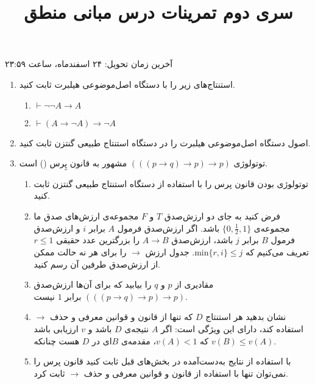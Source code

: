 \documentclass[12pt, 14paper]{article}
\title{سری دوم تمرینات درس مبانی منطق}
\author{}
\date{}
\begin{document}
\maketitle

\vspace{-2.5cm}

\begin{center}آخرین زمان تحویل: ۲۴ اسفندماه، ساعت ۲۳:۵۹\end{center}

\vspace{0.5cm}

\begin{enumerate}

\item
استنتاج‌های زیر را با دستگاه اصل‌موضوعی هیلبرت ثابت کنید.

\begin{enumerate}
\item
$\vdash \neg\neg A\to A$

\item
$\vdash (A\to\neg A)\to \neg A$
\end{enumerate}

\item
اصول دستگاه اصل‌موضوعی هیلبرت را در دستگاه استنتاج طبیعی گنتزن ثابت کنید.

\item
توتولوژی
$(((p\to q)\to p)\to p)$
مشهور به قانون پِرس
()
است.
\begin{enumerate}
\item
توتولوژی بودن قانون پرس را با استفاده از دستگاه استنتاج طبیعی گنتزن ثابت کنید.
\item
فرض کنید به جای دو ارزش‌صدق $T$ و $F$ مجموعه‌ی ارزش‌های صدق ما مجموعه‌ی $\{0,\frac{1}{2},1\}$ باشد. اگر ارزش‌صدق فرمول $A$ برابر $i$ و ارزش‌صدق فرمول $B$ برابر $j$ باشد، ارزش‌صدق $A\to B$ را بزرگترین عدد حقیقی $r\leq 1$ تعریف می‌کنیم که
$\text{min}\{r,i\}\leq j$.
جدول ارزش $\to$ را برای هر نه حالت ممکن از ارزش‌صدق طرفین آن رسم کنید.
\item
مقادیری از $p$ و $q$ را بیابید که برای آن‌ها ارزش‌صدق $(((p\to q)\to p)\to p)$ برابر $1$ نیست.
\item
نشان بدهید هر استنتاج $D$ که تنها از قانون
و قوانین معرفی و حذف $\to$ استفاده کند، دارای این ویژگی است: اگر $A$ نتیجه‌ی $D$ باشد و $v$ ارزیابی باشد که $v(A)<1$، مقدمه‌ی $B$ای در $D$ هست چنانکه $v(B)\leq v(A)$.
\item
با استفاده از نتایج به‌دست‌آمده در بخش‌های قبل ثابت کنید قانون پرس را نمی‌توان تنها با استفاده از قانون
و قوانین معرفی و حذف $\to$ ثابت کرد.
\end{enumerate}


\end{enumerate}
\end{document}
